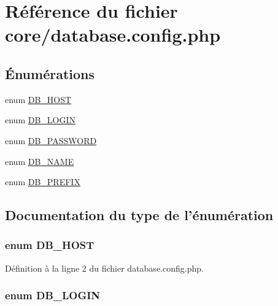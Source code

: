 \hypertarget{database_8config_8php}{\section{Référence du fichier core/database.config.\-php}
\label{database_8config_8php}
}
\subsection*{Énumérations}
\begin{DoxyCompactItemize}
\item 
enum \hyperlink{database_8config_8php_ac91a4a68860d6443b4af3115b80fe5c4}{D\-B\-\_\-\-H\-O\-S\-T} 
\item 
enum \hyperlink{database_8config_8php_a69a478107ac453f998cc3906e2591127}{D\-B\-\_\-\-L\-O\-G\-I\-N} 
\item 
enum \hyperlink{database_8config_8php_a7e717bf6e7045cd892772c56c69d9cb1}{D\-B\-\_\-\-P\-A\-S\-S\-W\-O\-R\-D} 
\item 
enum \hyperlink{database_8config_8php_a5d2a964cf672c9a1f11c290d6eafc2e1}{D\-B\-\_\-\-N\-A\-M\-E} 
\item 
enum \hyperlink{database_8config_8php_a74805092b141953388487c75e8be4127}{D\-B\-\_\-\-P\-R\-E\-F\-I\-X} 
\end{DoxyCompactItemize}


\subsection{Documentation du type de l'énumération}
\hypertarget{database_8config_8php_ac91a4a68860d6443b4af3115b80fe5c4}{
\subsubsection[{D\-B\-\_\-\-H\-O\-S\-T}]{\setlength{\rightskip}{0pt plus 5cm}enum {\bf D\-B\-\_\-\-H\-O\-S\-T}}}\label{database_8config_8php_ac91a4a68860d6443b4af3115b80fe5c4}


Définition à la ligne 2 du fichier database.\-config.\-php.

\hypertarget{database_8config_8php_a69a478107ac453f998cc3906e2591127}{
\subsubsection[{D\-B\-\_\-\-L\-O\-G\-I\-N}]{\setlength{\rightskip}{0pt plus 5cm}enum {\bf D\-B\-\_\-\-L\-O\-G\-I\-N}}}\label{database_8config_8php_a69a478107ac453f998cc3906e2591127}


